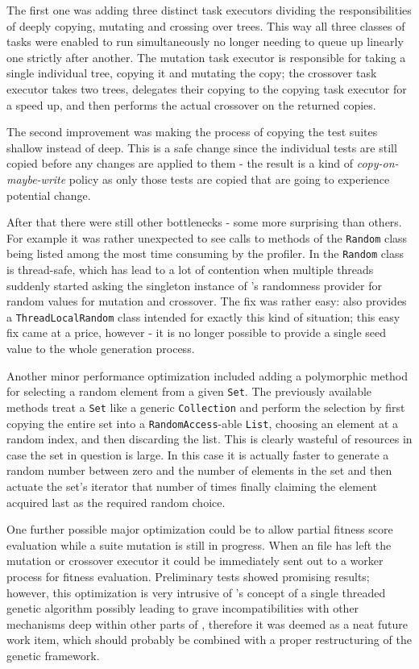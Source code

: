 The first one was adding three distinct task executors dividing the responsibilities of deeply copying, mutating and 
crossing over \xml trees. This way all three classes of tasks were enabled to run simultaneously 
no longer needing to queue up linearly one strictly after another. The mutation task executor is 
responsible for taking a single individual \xml tree, copying it and mutating the copy; the 
crossover task executor takes two \xml trees, delegates their copying to the copying task executor 
for a speed up, and then performs the actual crossover on the returned copies.

The second improvement was making the process of copying the test suites shallow instead of deep. 
This is a safe change since the individual tests are still copied before any changes are applied 
to them - the result is a kind of \emph{copy-on-maybe-write} policy as only those tests are copied 
that are going to experience potential change.

After that there were still other bottlenecks - some more surprising than others. For example 
it was rather unexpected to see calls to methods of the \texttt{Random} class being listed among the most time
consuming by the profiler. In  the \texttt{Random} class is thread-safe, which has lead to a lot of 
contention when multiple threads suddenly started asking the singleton instance of \evosuite's randomness 
provider for random values for mutation and crossover. The fix was rather easy:  also provides 
a \texttt{ThreadLocalRandom} class intended for exactly this kind of situation; this easy fix came 
at a price, however - it is no longer possible to provide a single seed value to the whole generation 
process.

Another minor performance optimization included adding a polymorphic method for selecting a random 
element from a given \texttt{Set}. The previously available methods treat a \texttt{Set} like a 
generic \texttt{Collection} and perform the selection by first copying the entire set into a 
\texttt{RandomAccess}-able \texttt{List}, choosing an element at a random index, and then discarding the list.
This is clearly wasteful of resources in case the set in question is large. In this case it is actually faster
to generate a random number between zero and the number of elements in the set and then actuate the set's
iterator that number of times finally claiming the element acquired last as the required random choice.

One further possible major optimization could be to allow partial fitness score evaluation while a suite 
mutation is still in progress. When an \xml file has left the mutation or crossover executor it could be 
immediately sent out to a worker process for fitness evaluation. Preliminary tests showed promising 
results; however, this optimization is very intrusive of \evosuite's concept of a single threaded 
genetic algorithm possibly leading to grave incompatibilities with other mechanisms deep within other parts 
of \evosuite, therefore it was deemed as a neat future work item, which should probably be combined with a 
proper restructuring of the genetic framework.

